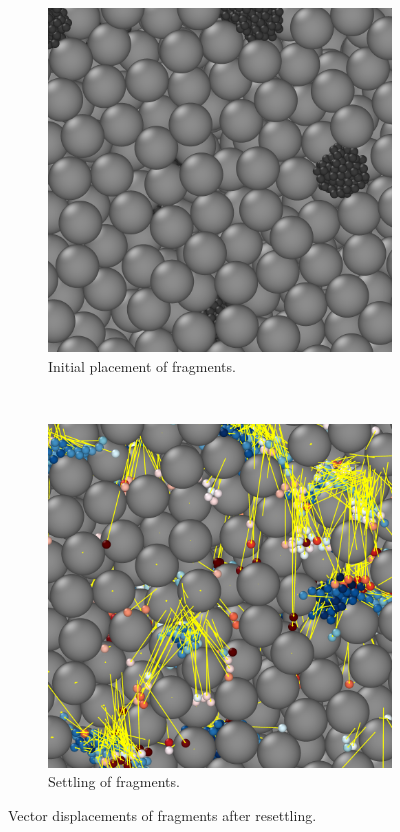 \documentclass[11pt]{report} %
\begin{document}
\begin{figure}[h]
        \centering
        \begin{subfigure}[t]{0.45\textwidth}
                \includegraphics[width=\textwidth]{images/crushed_initial}
                \caption{Initial placement of fragments.}
                \label{fig:crushed-initial}
        \end{subfigure}%
        ~
        \begin{subfigure}[t]{0.45\textwidth}
                \includegraphics[width=\textwidth]{images/crushed_final}
                \caption{Settling of fragments.}
                \label{fig:crushed-final}
        \end{subfigure}
        \caption{Vector displacements of fragments after resettling.}\label{fig:crushed-travel}
\end{figure}
\end{document}
